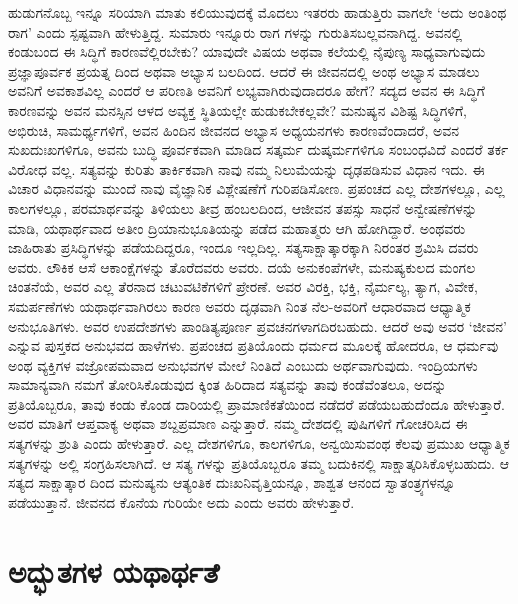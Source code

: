 ಹುಡುಗನೊಬ್ಬ ಇನ್ನೂ ಸರಿಯಾಗಿ ಮಾತು ಕಲಿಯುವುದಕ್ಕೆ ಮೊದಲು ಇತರರು ಹಾಡುತ್ತಿರು ವಾಗಲೇ ‘ಅದು ಅಂತಿಂಥ ರಾಗ’ ಎಂದು ಸ್ಪಷ್ಟವಾಗಿ ಹೇಳುತ್ತಿದ್ದ. ಸುಮಾರು ಇನ್ನೂರು ರಾಗ ಗಳನ್ನು ಗುರುತಿಸಬಲ್ಲವನಾಗಿದ್ದ. ಅವನಲ್ಲಿ ಕಂಡುಬಂದ ಈ ಸಿದ್ಧಿಗೆ ಕಾರಣವೆಲ್ಲಿರಬೇಕು? ಯಾವುದೇ ವಿಷಯ ಅಥವಾ ಕಲೆಯಲ್ಲಿ ನೈಪುಣ್ಯ ಸಾಧ್ಯವಾಗುವುದು ಪ್ರಜ್ಞಾಪೂರ್ವಕ ಪ್ರಯತ್ನ ದಿಂದ ಅಥವಾ ಅಭ್ಯಾಸ ಬಲದಿಂದ. ಆದರೆ ಈ ಜೀವನದಲ್ಲಿ ಅಂಥ ಅಭ್ಯಾಸ ಮಾಡಲು ಅವನಿಗೆ ಅವಕಾಶವಿಲ್ಲ ಎಂದರೆ ಆ ಪರಿಣತಿ ಅವನಿಗೆ ಲಭ್ಯವಾಗಿರುವುದಾದರೂ ಹೇಗೆ? ಸದ್ಯದ ಅವನ ಈ ಸಿದ್ಧಿಗೆ ಕಾರಣವನ್ನು ಅವನ ಮನಸ್ಸಿನ ಆಳದ ಅವ್ಯಕ್ತ ಸ್ಥಿತಿಯಲ್ಲೇ ಹುಡುಕಬೇಕಲ್ಲವೇ? ಮನುಷ್ಯನ ವಿಶಿಷ್ಟ ಸಿದ್ಧಿಗಳಿಗೆ, ಅಭಿರುಚಿ, ಸಾಮರ್ಥ್ಯಗಳಿಗೆ, ಅವನ ಹಿಂದಿನ ಜೀವನದ ಅಭ್ಯಾಸ ಅಧ್ಯಯನಗಳು ಕಾರಣವೆಂದಾದರೆ, ಅವನ ಸುಖದುಃಖಗಳಿಗೂ, ಅವನು ಬುದ್ಧಿ ಪೂರ್ವಕವಾಗಿ ಮಾಡಿದ ಸತ್ಕರ್ಮ ದುಷ್ಕರ್ಮಗಳಿಗೂ ಸಂಬಂಧವಿದೆ ಎಂದರೆ ತರ್ಕ ವಿರೋಧ ವಲ್ಲ. ಸತ್ಯವನ್ನು ಕುರಿತು ತಾರ್ಕಿಕವಾಗಿ ನಾವು ನಮ್ಮ ನಿಲುಮೆಯನ್ನು ದೃಢಪಡಿಸುವ ವಿಧಾನ ಇದು. ಈ ವಿಚಾರ ವಿಧಾನವನ್ನು ಮುಂದೆ ನಾವು ವೈಜ್ಞಾನಿಕ ವಿಶ್ಲೇಷಣೆಗೆ ಗುರಿಪಡಿಸೋಣ. ಪ್ರಪಂಚದ ಎಲ್ಲ ದೇಶಗಳಲ್ಲೂ, ಎಲ್ಲ ಕಾಲಗಳಲ್ಲೂ, ಪರಮಾರ್ಥವನ್ನು ತಿಳಿಯಲು ತೀವ್ರ ಹಂಬಲದಿಂದ, ಆಜೀವನ ತಪಸ್ಸು ಸಾಧನೆ ಅನ್ವೇಷಣೆಗಳನ್ನು ಮಾಡಿ, ಯಥಾರ್ಥವಾದ ಅತೀಂ ದ್ರಿಯಾನುಭೂತಿಯನ್ನು ಪಡೆದ ಮಹಾತ್ಮರು ಆಗಿ ಹೋಗಿದ್ದಾರೆ. ಅಂಥವರು ಜಾಹಿರಾತು ಪ್ರಸಿದ್ಧಿಗಳನ್ನು ಪಡೆಯದಿದ್ದರೂ, ಇಂದೂ ಇಲ್ಲದಿಲ್ಲ. ಸತ್ಯಸಾಕ್ಷಾತ್ಕಾರಕ್ಕಾಗಿ ನಿರಂತರ ಶ್ರಮಿಸಿ ದವರು ಅವರು. ಲೌಕಿಕ ಆಸೆ ಆಕಾಂಕ್ಷೆಗಳನ್ನು ತೊರೆದವರು ಅವರು. ದಯೆ ಅನುಕಂಪೆಗಳೇ, ಮನುಷ್ಯಕುಲದ ಮಂಗಲ ಚಿಂತನೆಯೆ, ಅವರ ಎಲ್ಲ ತೆರನಾದ ಚಟುವಟಿಕೆಗಳಿಗೆ ಪ್ರೇರಣೆ. ಅವರ ವಿರಕ್ತಿ, ಭಕ್ತಿ, ನೈರ್ಮಲ್ಯ, ತ್ಯಾಗ, ವಿವೇಕ, ಸಮರ್ಪಣೆಗಳು ಯಥಾರ್ಥವಾಗಿರಲು ಕಾರಣ ಅವರು ದೃಢವಾಗಿ ನಿಂತ ನೆಲ-ಅವರಿಗೆ ಆಧಾರವಾದ ಆಧ್ಯಾತ್ಮಿಕ ಅನುಭೂತಿಗಳು. ಅವರ ಉಪದೇಶಗಳು ಪಾಂಡಿತ್ಯಪೂರ್ಣ ಪ್ರವಚನಗಳಾಗದಿರಬಹುದು. ಆದರೆ ಅವು ಅವರ ‘ಜೀವನ’ ಎನ್ನುವ ಪುಸ್ತಕದ ಅನುಭವದ ಹಾಳೆಗಳು. ಪ್ರಪಂಚದ ಪ್ರತಿಯೊಂದು ಧರ್ಮದ ಮೂಲಕ್ಕೆ ಹೋದರೂ, ಆ ಧರ್ಮವು ಅಂಥ ವ್ಯಕ್ತಿಗಳ ವಜ್ರೋಪಮವಾದ ಅನುಭವಗಳ ಮೇಲೆ ನಿಂತಿದೆ ಎಂಬುದು ಅರ್ಥವಾಗುವುದು. ಇಂದ್ರಿಯಗಳು ಸಾಮಾನ್ಯವಾಗಿ ನಮಗೆ ತೋರಿಸಿಕೊಡುವುದ ಕ್ಕಿಂತ ಹಿರಿದಾದ ಸತ್ಯವನ್ನು ತಾವು ಕಂಡೆವೆಂತಲೂ, ಅದನ್ನು ಪ್ರತಿಯೊಬ್ಬರೂ, ತಾವು ಕಂಡು ಕೊಂಡ ದಾರಿಯಲ್ಲಿ ಪ್ರಾಮಾಣಿಕತೆಯಿಂದ ನಡೆದರೆ ಪಡೆಯಬಹುದೆಂದೂ ಹೇಳುತ್ತಾರೆ. ಅವರ ಮಾತಿಗೆ ಆಪ್ತವಾಕ್ಯ ಅಥವಾ ಶಬ್ದಪ್ರಮಾಣ ಎನ್ನುತ್ತಾರೆ. ನಮ್ಮ ದೇಶದಲ್ಲಿ ಪುಷಿಗಳಿಗೆ ಗೋಚರಿಸಿದ ಈ ಸತ್ಯಗಳನ್ನು ಶ್ರುತಿ ಎಂದು ಹೇಳುತ್ತಾರೆ. ಎಲ್ಲ ದೇಶಗಳಿಗೂ, ಕಾಲಗಳಿಗೂ, ಅನ್ವಯಿಸುವಂಥ ಕೆಲವು ಪ್ರಮುಖ ಆಧ್ಯಾತ್ಮಿಕ ಸತ್ಯಗಳನ್ನು ಅಲ್ಲಿ ಸಂಗ್ರಹಿಸಲಾಗಿದೆ. ಆ ಸತ್ಯ ಗಳನ್ನು ಪ್ರತಿಯೊಬ್ಬರೂ ತಮ್ಮ ಬದುಕಿನಲ್ಲಿ ಸಾಕ್ಷಾತ್ಕರಿಸಿಕೊಳ್ಳಬಹುದು. ಆ ಸತ್ಯದ ಸಾಕ್ಷಾತ್ಕಾರ ದಿಂದ ಮನುಷ್ಯನು ಆತ್ಯಂತಿಕ ದುಃಖನಿವೃತ್ತಿಯನ್ನೂ, ಶಾಶ್ವತ ಆನಂದ ಸ್ವಾತಂತ್ರ್ಯಗಳನ್ನೂ ಪಡೆಯುತ್ತಾನೆ. ಜೀವನದ ಕೊನೆಯ ಗುರಿಯೇ ಅದು ಎಂದು ಅವರು ಹೇಳುತ್ತಾರೆ.


\section{ಅದ್ಭುತಗಳ ಯಥಾರ್ಥತೆ}

